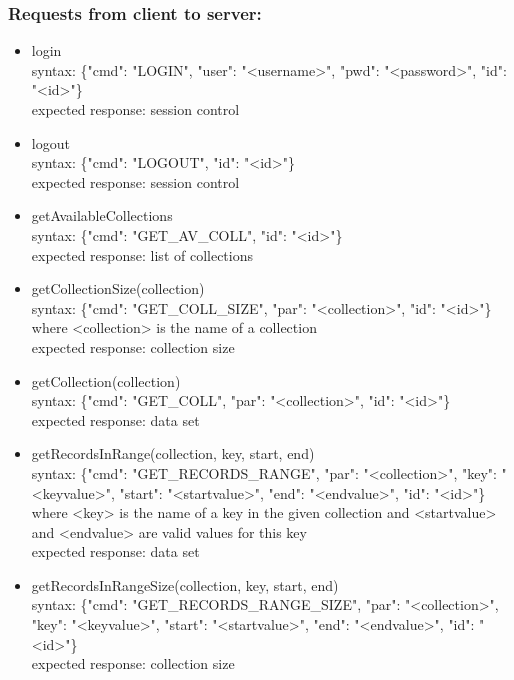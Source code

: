\documentclass[oneside, english, final]{design}
\begin{document}
\subsubsection{Requests from client to server:}
\begin{itemize}
	\item{login}
	      \\
	      syntax: \{"cmd": "LOGIN", "user": "<username>", "pwd": "<password>", "id": "<id>"\} \\
	      expected response: session control

	\item{logout}
	      \\
	      syntax: \{"cmd": "LOGOUT", "id": "<id>"\} \\
	      expected response: session control

	\item{getAvailableCollections}
	      \\
	      syntax: \{"cmd": "GET\_AV\_COLL", "id": "<id>"\} \\
	      expected response: list of collections

	\item{getCollectionSize(collection)}
	      \\
	      syntax: \{"cmd": "GET\_COLL\_SIZE", "par": "<collection>", "id": "<id>"\} \\
	      where <collection> is the name of a collection\\
	      expected response: collection size

	\item{getCollection(collection)}
	      \\
	      syntax: \{"cmd": "GET\_COLL", "par": "<collection>", "id": "<id>"\} \\
	      expected response: data set

	\item{getRecordsInRange(collection, key, start, end)}
	      \\
	      syntax: \{"cmd": "GET\_RECORDS\_RANGE", "par": "<collection>", "key": "<keyvalue>", "start": "<startvalue>", "end": "<endvalue>", "id": "<id>"\} \\
	      where <key> is the name of a key in the given collection and <startvalue> and <endvalue> are valid values for this key\\
	      expected response: data set

	\item{getRecordsInRangeSize(collection, key, start, end)}
	      \\
	      syntax: \{"cmd": "GET\_RECORDS\_RANGE\_SIZE", "par": "<collection>", "key": "<keyvalue>", "start": "<startvalue>", "end": "<endvalue>", "id": "<id>"\} \\
	      expected response: collection size

\end{itemize}
\end{document}

